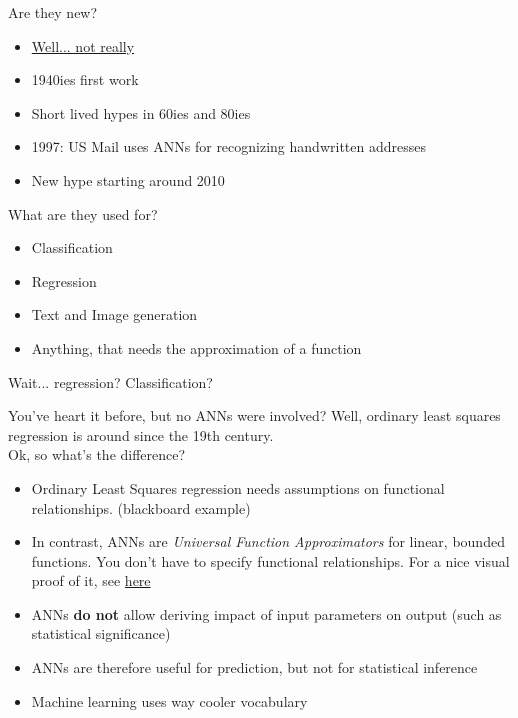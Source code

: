 \documentclass[color=usenames,dvipsnames]{beamer}
\begin{document}
\begin{frame}{Are they new?} 

\begin{itemize}
\item \href{https://scholar.google.at/citations?user=tvUH3WMAAAAJ&hl=de}{{Well... not really}}
\item 1940ies first work
\item Short lived hypes in 60ies and 80ies
\item 1997: US Mail uses ANNs for recognizing handwritten addresses
\item New hype starting around 2010
\end{itemize}

\end{frame}


\begin{frame}{What are they used for?} 

\begin{itemize}
\item Classification
\item Regression
\item Text and Image generation
\item Anything, that needs the approximation of a function
\end{itemize}

\end{frame}

\begin{frame}{Wait... regression? Classification?} 

You've heart it before, but no ANNs were involved? Well, ordinary least squares regression is around since the 19th century.\\

Ok, so what's the difference?\\

\begin{itemize}
\item Ordinary Least Squares regression needs assumptions on functional relationships. (blackboard example)
\item In contrast, ANNs are \textit{Universal Function Approximators} for linear, bounded functions. You don't have to specify functional relationships. For a nice visual proof of it, see \href{http://neuralnetworksanddeeplearning.com/chap4.html} {{here}}
\item ANNs \textbf{do not} allow deriving impact of input parameters on output (such as statistical significance)
\item ANNs are therefore useful for prediction, but not for statistical inference
\item Machine learning uses way cooler vocabulary
\end{itemize} 

\end{frame}
\end{document}
